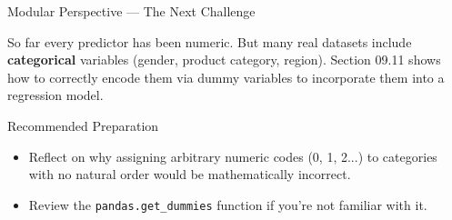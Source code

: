 \documentclass[10pt, aspectratio=169]{beamer}
\begin{document}
\begin{frame}{Modular Perspective --- The Next Challenge}
  \scriptsize
  \begin{retoclase}
    So far every predictor has been numeric. But many real datasets include \textbf{categorical} variables (gender, product category, region). Section 09.11 shows how to correctly encode them via dummy variables to incorporate them into a regression model.
  \end{retoclase}

  \vspace{0.08cm}
  \pause
  \begin{alertblock}{Recommended Preparation}
    \begin{itemize}\itemsep=0.06cm
      \item Reflect on why assigning arbitrary numeric codes (0, 1, 2...) to categories with no natural order would be mathematically incorrect.
      \item Review the \texttt{pandas.get\_dummies} function if you're not familiar with it.
    \end{itemize}
  \end{alertblock}
\end{frame}
\end{document}
